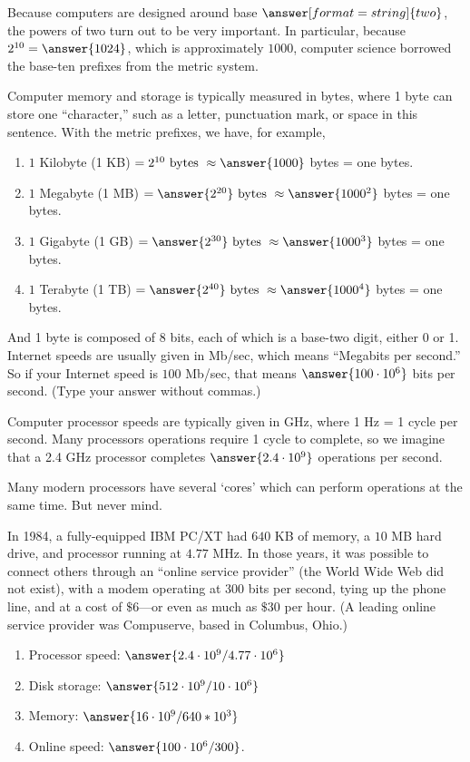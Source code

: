 \documentclass[nooutcomes]{ximera}
\begin{document}
Because computers are designed around base $\answer[format=string]{two}$, the powers of two turn out to be very important.  In particular, because $2^{10}=\answer{1024}$, which is approximately $1000$, computer science borrowed the base-ten prefixes from the metric system.  

Computer memory and storage is typically measured in bytes, where 1 byte can store one ``character,'' such as a letter, punctuation mark, or space in this sentence.  With the metric prefixes, we have, for example, 
\begin{enumerate}
\item $1$ Kilobyte (1 KB) $=  2^{10}\textrm{ bytes }\approx \answer{1000}$ bytes = one  bytes.
\item $1$ Megabyte (1 MB) $=  \answer{2^{20}} \textrm{ bytes } \approx \answer{1000^2}$ bytes = one  bytes.
\item $1$ Gigabyte (1 GB) $=  \answer{2^{30}} \textrm{ bytes } \approx \answer{1000^3}$ bytes = one  bytes.
\item $1$ Terabyte (1 TB) $=  \answer{2^{40}} \textrm{ bytes } \approx \answer{1000^4}$ bytes = one  bytes.
\end{enumerate}


And 1 byte is composed of 8 bits, each of which is a base-two digit, either 0 or 1.  Internet speeds are usually given in Mb/sec, which means ``Megabits per second.'' So if your Internet speed is $100$ Mb/sec, 
that means $\answer{100\cdot10^6}$ bits per second.  (Type your answer without commas.)

Computer processor speeds are typically given in GHz, where 1 Hz = 1 cycle per second.  Many processors operations require 1 cycle to complete, so we imagine that a 2.4 GHz processor completes $\answer{2.4\cdot10^9}$ operations per second.  

Many modern processors have several `cores' which can perform operations at the same time.  But never mind.  

In 1984, a fully-equipped IBM PC/XT had $640$ KB of memory, a $10$ MB hard drive, and processor running at $4.77$ MHz.  In those years, it was possible to connect others through an ``online service provider'' (the World Wide Web did not exist), with a modem operating at 300 bits per second, tying up the phone line, and at a cost of $\$6$---or even as much as $\$30$ per hour.  (A leading online service provider was Compuserve, based in Columbus, Ohio.)  

\begin{enumerate}
\item Processor speed: $\answer{2.4\cdot10^9/4.77\cdot10^6}$
\item Disk storage: $\answer{512\cdot10^9/10\cdot10^6}$
\item Memory: $\answer{16\cdot10^9/640*10^3}$
\item Online speed: $\answer{100\cdot10^6/300}$. %
\end{enumerate}
\end{document}

